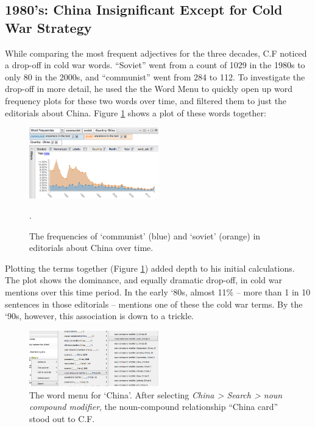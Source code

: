 \documentclass{sig-alternate}
\begin{document}
\subsection{1980's: China Insignificant Except for Cold War Strategy}
While comparing the most frequent adjectives for the three decades, C.F noticed a drop-off in cold war words. ``Soviet''  went from  a count of 1029 in the 1980s to only 80 in the 2000s, and ``communist'' went from 284 to 112.   To investigate the drop-off in more detail, he used the the Word Menu to quickly open up word frequency plots for these two words over time, and filtered them to just the editorials about China.  Figure \ref{fig:chris04b} shows a plot of these words together:

\begin{figure}[h!]
\includegraphics[width=0.5\textwidth]{fig/chris/04b.png}
\caption{The frequencies of `communist' (blue) and `soviet' (orange) in editorials about China over time. \label{fig:chris04b}}.
\end{figure}

Plotting the terms together (Figure \ref{fig:chris04b}) added depth to his initial calculations.  The plot shows the dominance, and equally dramatic drop-off, in cold war mentions over this time period. In the early `80s, almost 11\% -- more than 1 in 10 sentences in those editorials -- mentions one of these the cold war terms. By the `90s, however, this association is down to a trickle. 

\begin{figure}[h!]
\includegraphics[width=0.5\textwidth]{fig/chris/01.png}
\caption{The word menu for `China'.   After selecting \emph{China > Search > noun compound modifier}, the noun-compound relationship ``China card'' stood out to C.F. \label{fig:chris01}}
\end{figure}
\end{document}
